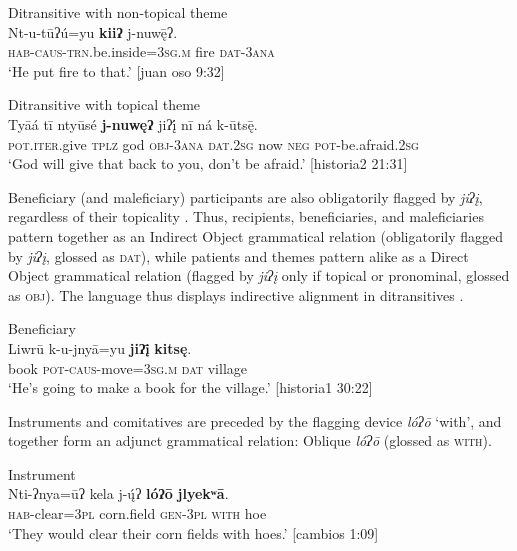 \documentclass[output=paper]{../langscibook}
\begin{document}
\ea\label{ex:campbell:10}
{Ditransitive with non-topical theme}\\
\gll Nt-u-tūʔú=yu  \textbf{kiiʔ}  j-nuw\={ę}ʔ.\\
     \textsc{hab-caus-trn.}be.inside=3\textsc{sg.m}  fire  \textsc{dat}{}-\textsc{3ana}\\
\glt ‘He put fire to that.’ [juan oso 9:32]
\z

\ea\label{ex:campbell:11}
{Ditransitive with topical theme}\\
\gll Tyāá  tī  ntyūsé  \textbf{j-nuwęʔ}  jiʔį́  nī  ná  k-ūts\={ę}.\\
     \textsc{pot}.\textsc{iter}.give  \textsc{tplz}  god  \textsc{obj}{}-\textsc{3ana}  \textsc{dat}.\textsc{2sg}  now  \textsc{neg}  \textsc{pot}{}-be.afraid.\textsc{2sg}\\
\glt ‘God will give that back to you, don’t be afraid.’ [historia2 21:31]
\z


Beneficiary (and maleficiary) participants are also obligatorily flagged by \textit{jiʔį}, regardless of their topicality . Thus, recipients, beneficiaries, and maleficiaries pattern together as an Indirect Object grammatical relation (obligatorily flagged by \textit{jiʔį}, glossed as \textsc{dat}), while patients and themes pattern alike as a Direct Object grammatical relation (flagged by \textit{jiʔį} only if topical or pronominal, glossed as \textsc{obj}). The language thus displays indirective alignment in ditransitives \citep{MalchukovEtAl2010}.


\ea\label{ex:campbell:12}
{Beneficiary} \\
\gll Liwrū  k-u-jnyā=yu  \textbf{jiʔį̄}  \textbf{kitsę}.\\
     book  \textsc{pot-caus-}move=3\textsc{sg.m}  \textsc{dat}  village\\
\glt ‘He’s going to make a book for the village.’ [historia1 30:22]
\z


Instruments  and comitatives  are preceded by the flagging device \textit{lóʔō} ‘with’, and together form an adjunct grammatical relation: Oblique \textit{lóʔō} (glossed as \textsc{with)}.


\ea\label{ex:campbell:13}
{Instrument}\\
\gll Nti-ʔnya=ūʔ  kela  j-\'{\k{u}}ʔ  \textbf{lóʔō}  \textbf{jlyekʷā}.\\
     \textsc{hab-}clear=\textsc{3pl}  corn.field  \textsc{gen}{}-3\textsc{pl}  \textsc{with}  hoe\\
\glt ‘They would clear their corn fields with hoes.’ [cambios 1:09]
\z
\end{document}

